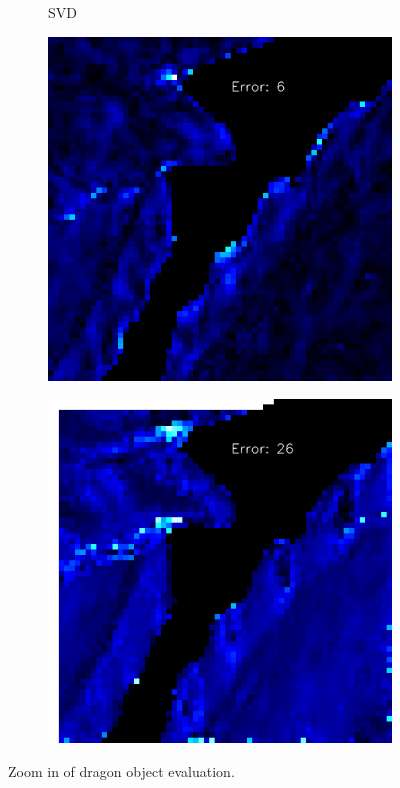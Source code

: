 \begin{figure}[th]
\begin{subfigure}[b]{0.15\linewidth}
		\caption{SVD}
	\end{subfigure}
	\begin{subfigure}[b]{0.15\linewidth}
	\includegraphics[width=\linewidth]{./Figures/comparison/eval_2_error_GCNN.png}
	\caption{}
	\end{subfigure}
	\begin{subfigure}[b]{0.15\linewidth}
		\includegraphics[width=\linewidth]{./Figures/comparison/eval_2_error_SVD.png}
		\caption{}
	\end{subfigure}
	\caption{Zoom in of dragon object evaluation.}
	\label{fig:gcnn-eval-synthetic-zoom-in}
\end{figure}



